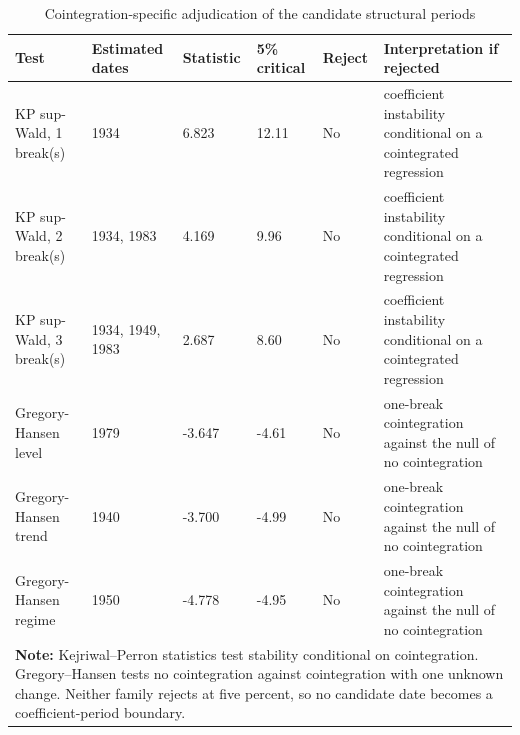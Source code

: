 \begin{table}[h!]
\centering\scriptsize
\caption{Cointegration-specific adjudication of the candidate structural periods}
\label{tab:break-adjudication}
\begin{tabular}{p{2.35cm}p{1.55cm}p{1.30cm}p{1.30cm}p{1.00cm}p{4.85cm}}
\toprule
\textbf{Test} & \textbf{Estimated dates} & \textbf{Statistic} & \textbf{5\% critical} & \textbf{Reject} & \textbf{Interpretation if rejected}\\
\midrule
KP sup-Wald, 1 break(s) & 1934 & 6.823 & 12.11 & No & coefficient instability conditional on a cointegrated regression \\
KP sup-Wald, 2 break(s) & 1934, 1983 & 4.169 & 9.96 & No & coefficient instability conditional on a cointegrated regression \\
KP sup-Wald, 3 break(s) & 1934, 1949, 1983 & 2.687 & 8.60 & No & coefficient instability conditional on a cointegrated regression \\
Gregory-Hansen level & 1979 & -3.647 & -4.61 & No & one-break cointegration against the null of no cointegration \\
Gregory-Hansen trend & 1940 & -3.700 & -4.99 & No & one-break cointegration against the null of no cointegration \\
Gregory-Hansen regime & 1950 & -4.778 & -4.95 & No & one-break cointegration against the null of no cointegration \\
\bottomrule
\multicolumn{6}{p{13.1cm}}{\footnotesize \textbf{Note:} Kejriwal--Perron statistics test stability conditional on cointegration. Gregory--Hansen tests no cointegration against cointegration with one unknown change. Neither family rejects at five percent, so no candidate date becomes a coefficient-period boundary.}
\end{tabular}
\end{table}
